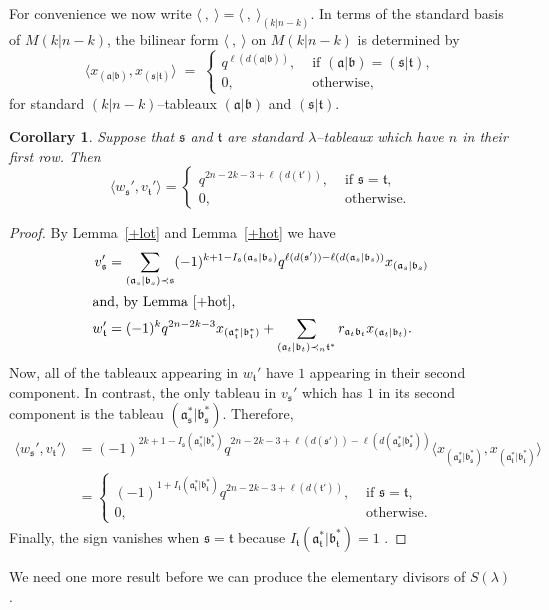 \documentclass[twoside]{amsart}
\def\If{\text{\ if\ }}
\def\Otherwise{\text{\ otherwise}}
\numberwithin{equation}{section}
\newtheorem{Corollary}[equation]{Corollary}
\theoremstyle{remark}
\let\>\rangle
\let\<\langle
\def\len(#1){\ell(#1)}
\def\a{\mathfrak a}
\def\b{\mathfrak b}
\def\s{\mathfrak s}
\def\t{\mathfrak t}
\begin{document}
For convenience we now write $\<\ ,\ \>=\<\ ,\ \>_{(k|n{-}k)}$. In
terms of the standard basis of $M(k|n-k)$, the bilinear form 
$\<\ ,\ \>$ on $M(k|n-k)$ is determined by
$$
\<x_{(\a|\b)}, x_{(\s|\t)}\> \; =\; 
\begin{cases}
q^{\len(d(\a|\b))},& \If (\a|\b)=(\s|\t),\\
0,                 & \Otherwise,
\end{cases}
$$
for standard $(k|n-k)$--tableaux $(\a|\b)$ and $(\s|\t)$.

\begin{Corollary}\label{top half}
Suppose that $\s$ and $\t$ are standard $\lambda$--tableaux which have
$n$ in their first row. Then
$$\<w_\s',v_\t'\>=\begin{cases}q^{2n-2k-3+\len(d(\t'))},&\If\s=\t,\\
                               0,&\Otherwise.
\end{cases}$$
\end{Corollary}

\begin{proof}By Lemma~\ref{+lot} and Lemma~\ref{+hot} we have
\begin{align*}
v_\s'&=\sum_{(\a_s|\b_s)\prec\s}
    (-1)^{k+1-I_\s(\a_s|\b_s)}q^{\len(d(\s'))-\len(d(\a_s|\b_s))}
              x_{(\a_s|\b_s)}\\
\intertext{and, by Lemma \ref{+hot},} 
w_\t'&=(-1)^kq^{2n-2k-3}x_{(\a_\t^*|\b_\t^*)}
        +\sum_{(\a_t|\b_t)\prec_n\t^*}r_{\a_t\b_t}x_{(\a_t|\b_t)}.
\end{align*}
Now, all of the tableaux appearing in $w_\t'$ have $1$
appearing in their second component. In contrast, the only tableau in
$v_\s'$ which has $1$ in its second component is the tableau
$(\a_\s^*|\b_\s^*)$. Therefore,
\begin{align*}
\<w_\s',v_\t'\>
    &=(-1)^{2k+1-I_\s(\a_s^*|\b_s^*)}
      q^{2n-2k-3+\len(d(\s'))-\len(d(\a_\s^*|\b_\s^*))}
             \<x_{(\a_\s^*|\b_\s^*)},x_{(\a_\t^*|\b_\t^*)}\>\\
    &=\begin{cases}
          (-1)^{1+I_\t(\a_\t^*|\b_\t^*)}
           q^{2n-2k-3+\len(d(\t'))},&\If\s=\t,\\  
           0,&\Otherwise.
      \end{cases}
\end{align*}
Finally, the sign vanishes when $\s=\t$ because $I_\t(\a_\t^*|\b_\t^*)=1$ .
\end{proof}

We need one more result before we can produce the elementary divisors
of $S(\lambda)$.
\end{document}
